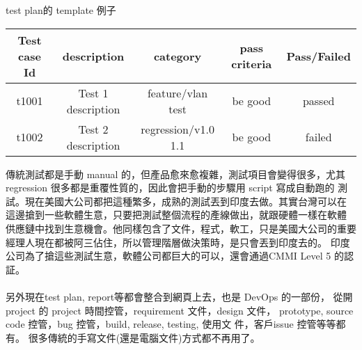 test plan的 template 例子
\begin{center}
\begin{tabular}{|c|c|c|c|c|}
  \hline
  \hline
  Test case Id & description & category & pass criteria & Pass/Failed \\
  \hline
  t1001 & Test 1 description &  feature/vlan test & be good & passed \\
  \hline
  t1002 & Test 2 description &  regression/v1.0 1.1 & be good & failed \\
  \hline
\end{tabular}
\end{center}
傳統測試都是手動 manual 的，但產品愈來愈複雜，測試項目會變得很多，尤其
regression 很多都是重覆性質的，因此會把手動的步驟用 script 寫成自動跑的
測試。現在美國大公司都把這種繁多，成熟的測試丟到印度去做。其實台灣可以在
這邊搶到一些軟體生意，只要把測試整個流程的產線做出，就跟硬體一樣在軟體
供應鏈中找到生意機會。他同樣包含了文件，程式，軟工，只是美國大公司的重要
經理人現在都被阿三佔住，所以管理階層做決策時，是只會丟到印度去的。
印度公司為了搶這些測試生意，軟體公司都巨大的可以，還會通過CMMI Level 5
的認証。
\\\\
另外現在test plan, report等都會整合到網頁上去，也是 DevOps 的一部份，
從開 project 的 project 時間控管，requirement 文件，design 文件，
prototype, source code 控管，bug 控管，build, release, testing, 使用文
件，客戶issue 控管等等都有。
很多傳統的手寫文件(還是電腦文件)方式都不再用了。
